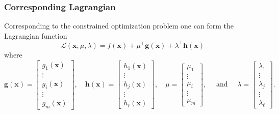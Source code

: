 \documentclass[13pt]{article}
\theoremstyle{definition}
\theoremstyle{remark}
\begin{document}
\subsubsection{Corresponding Lagrangian}
Corresponding to the constrained optimization problem one can form the Lagrangian function
$$
\mathcal{L}(\bm{x}, \mu, \lambda)=f(\bm{x})+\mu^{\top} \mathbf{g}(\bm{x})+\lambda^{\top} \mathbf{h}(\bm{x})
$$
where
$$
\mathbf{g}(\bm{x})=\left[\begin{array}{c}
g_1(\bm{x}) \\
\vdots \\
g_i(\bm{x}) \\
\vdots \\
g_m(\bm{x})
\end{array}\right], \quad \mathbf{h}(\bm{x})=\left[\begin{array}{c}
h_1(\bm{x}) \\
\vdots \\
h_j(\bm{x}) \\
\vdots \\
h_{\ell}(\bm{x})
\end{array}\right], \quad \mu=\left[\begin{array}{c}
\mu_1 \\
\vdots \\
\mu_i \\
\vdots \\
\mu_m
\end{array}\right], \quad \text { and } \quad \lambda=\left[\begin{array}{c}
\lambda_1 \\
\vdots \\
\lambda_j \\
\vdots \\
\lambda_{\ell}
\end{array}\right] .
$$
\end{document}
